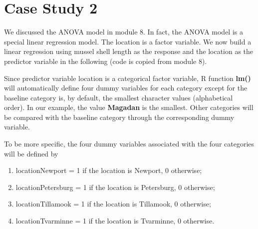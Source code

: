 \documentclass[
]{book}
\begin{document}
\hypertarget{case-study-2}{%
\section{Case Study 2}\label{case-study-2}}

We discussed the ANOVA model in module 8. In fact, the ANOVA model is a special linear regression model. The location is a factor variable. We now build a linear regression using mussel shell length as the response and the location as the predictor variable in the following (code is copied from module 8).

Since predictor variable location is a categorical factor variable, R function \textbf{lm()} will automatically define four dummy variables for each category except for the baseline category is, by default, the smallest character values (alphabetical order). In our example, the value \textbf{Magadan} is the smallest. Other categories will be compared with the baseline category through the corresponding dummy variable.

To be more specific, the four dummy variables associated with the four categories will be defined by

\begin{enumerate}
\def\labelenumi{\arabic{enumi}.}
\item
  locationNewport = 1 if the location is Newport, 0 otherwise;
\item
  locationPetersburg = 1 if the location is Petersburg, 0 otherwise;
\item
  locationTillamook = 1 if the location is Tillamook, 0 otherwise;
\item
  locationTvarminne = 1 if the location is Tvarminne, 0 otherwise.
\end{enumerate}
\end{document}
